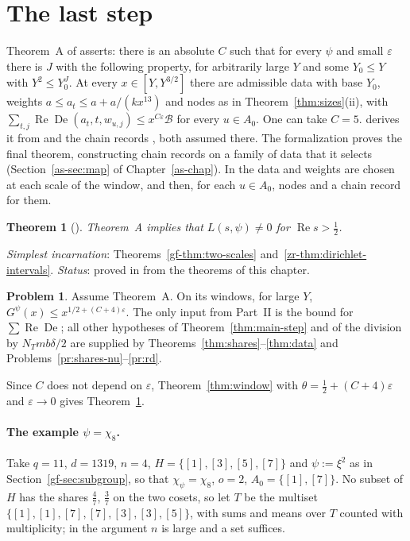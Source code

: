 \documentclass[reqno]{amsart}
\newcounter{chap}
\theoremstyle{definition}
\newtheorem{problem}{Problem}[section]
\theoremstyle{plain}
\newtheorem{theorem}{Theorem}[section]
\newcommand{\Bc}{\mathcal{B}}
\newcommand{\De}{\operatorname{De}}
\renewcommand{\Re}{\operatorname{Re}}
\begin{document}
\section{The last step}\label{sec:last}

Theorem~A of \cite{Adr} asserts: there is an absolute \(C\) such that for every \(\psi\) and small \(\varepsilon\) there is \(J\) with the following property, for arbitrarily large \(Y\) and some \(Y_0 \le Y\) with \(Y^2 \le Y_0^J\).  At every \(x \in [Y, Y^{3/2}]\) there are admissible data with base \(Y_0\), weights \(a \le a_t \le a + a/(kx^{13})\) and nodes as in Theorem~\ref{thm:sizes}(ii), with \(\sum_{t,j}\Re\De(a_t, t, w_{u,j}) \le x^{C\varepsilon}\Bc\) for every \(u \in A_0\).  One can take \(C = 5\).  \cite[\S18.6]{Adr} derives it from \cite[Hyp.~17.11]{Adr} and the chain records \cite[Hyp.~18.10]{Adr}, both assumed there.  The formalization proves the final theorem, constructing chain records on a family of data that it selects (Section~\ref{as-sec:map} of Chapter~\ref{as-chap}).  In \cite[Hyp.~18.10]{Adr} the data and weights are chosen at each scale of the window, and then, for each \(u \in A_0\), nodes and a chain record for them.

\begin{theorem}[{\cite[Thm.~6.3]{Adr}}]\label{thm:last}
Theorem~A implies that \(L(s,\psi) \ne 0\) for \(\Re s > \frac12\).
\end{theorem}

\noindent\emph{Simplest incarnation}: Theorems~\ref{gf-thm:two-scales} and~\ref{zr-thm:dirichlet-intervals}.  \emph{Status}: proved in \cite{Adr} from the theorems of this chapter.

\begin{problem}\label{pr:theoremA}
Assume Theorem~A.  On its windows, for large \(Y\), \(G^\psi(x) \le x^{1/2+(C+4)\varepsilon}\).  The only input from Part~II is the bound for \(\sum\Re\De\); all other hypotheses of Theorem~\ref{thm:main-step} and of the division by \(N_Tmb\delta/2\) are supplied by Theorems~\ref{thm:shares}--\ref{thm:data} and Problems~\ref{pr:shares-nu}--\ref{pr:rd}.
\end{problem}

Since \(C\) does not depend on \(\varepsilon\), Theorem~\ref{thm:window} with \(\theta = \frac12 + (C+4)\varepsilon\) and \(\varepsilon \to 0\) gives Theorem~\ref{thm:last}.

\paragraph{The example \(\psi = \chi_8\).}  Take \(q = 11\), \(d = 1319\), \(n = 4\), \(H = \{[1],[3],[5],[7]\}\) and \(\psi := \xi^2\) as in Section~\ref{gf-sec:subgroup}, so that \(\chi_\psi = \chi_8\), \(o = 2\), \(A_0 = \{[1],[7]\}\).  No subset of \(H\) has the shares \(\frac47\), \(\frac37\) on the two cosets, so let \(T\) be the multiset \(\{[1],[1],[7],[7],[3],[3],[5]\}\), with sums and means over \(T\) counted with multiplicity; in the argument \(n\) is large and a set suffices.
\end{document}

